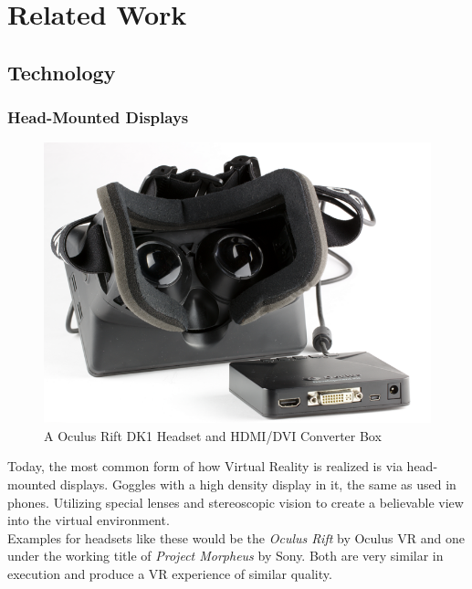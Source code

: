 \documentclass[11pt]{article}
\begin{document}
\section{Related Work}
	\subsection{Technology}
	\subsubsection{Head-Mounted Displays}
	
	\begin{figure}
		\vspace{-20pt}
		\begin{center}
			\includegraphics[scale=0.3]{images/or_small.png}
		\end{center}			
		\vspace{-20pt}
			\caption{A Oculus Rift DK1 Headset and HDMI/DVI Converter Box}
		\vspace{-10pt}
	\end{figure}
	
		Today, the most common form of how Virtual Reality is realized is via head-mounted displays. Goggles with a high density display in it, the same as used in phones. Utilizing special lenses and stereoscopic vision to create a believable view into the virtual environment. \\
		Examples for headsets like these would be the \emph{Oculus Rift} by Oculus VR and one under the working title of \emph{Project Morpheus} by Sony. Both are very similar in execution and produce a VR experience of similar quality. \cite{goradia2014review}
	
\end{document}
